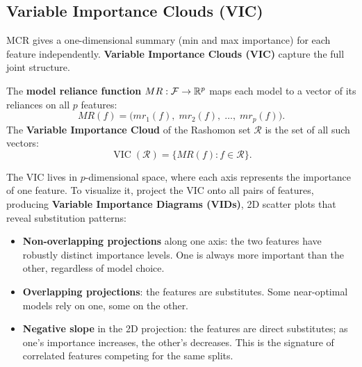 \subsection{Variable Importance Clouds (VIC)}\label{sec:rashomon:vic}

MCR gives a one-dimensional summary (min and max importance) for each
feature independently.  \textbf{Variable Importance Clouds (VIC)}
\citep{DongRudin2020} capture the full joint structure.

\begin{definition}
The \textbf{model reliance function} $MR : \mathcal{F} \to \mathbb{R}^p$ maps each
model to a vector of its reliances on all $p$ features:
\[
  MR(f) = \bigl(mr_1(f),\; mr_2(f),\; \ldots,\; mr_p(f)\bigr).
\]
The \textbf{Variable Importance Cloud} of the Rashomon set $\mathcal{R}$ is
the set of all such vectors:
\begin{equation}\label{eq:vic}
  \operatorname{VIC}(\mathcal{R}) = \bigl\{MR(f) : f \in \mathcal{R}\bigr\}.
\end{equation}
\end{definition}

The VIC lives in $p$-dimensional space, where each axis represents the
importance of one feature.  To visualize it, \citet{DongRudin2020} project
the VIC onto all pairs of features, producing \textbf{Variable Importance
Diagrams (VIDs)}, 2D scatter plots that reveal substitution patterns:

\begin{itemize}[leftmargin=1.8em]
  \item \textbf{Non-overlapping projections} along one axis: the two
    features have robustly distinct importance levels.  One is always more
    important than the other, regardless of model choice.
  \item \textbf{Overlapping projections}: the features are substitutes.
    Some near-optimal models rely on one, some on the other.
  \item \textbf{Negative slope} in the 2D projection: the features are
    direct substitutes; as one's importance increases, the other's
    decreases.  This is the signature of correlated features competing for
    the same splits.
\end{itemize}

